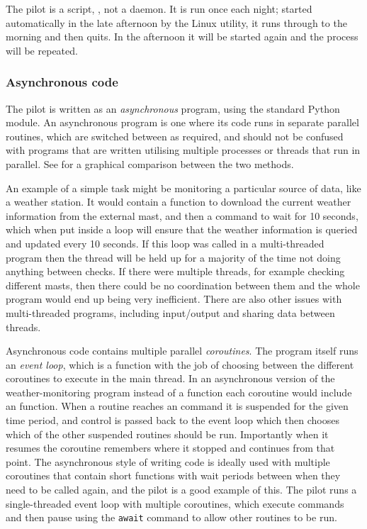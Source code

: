 \begin{colsection}
\begin{colsection}
The pilot is a  script, , not a daemon. It is run once each night; started automatically in the late afternoon by the Linux  utility, it runs through to the morning and then quits. In the afternoon it will be started again and the process will be repeated.

\subsubsection{Asynchronous code}

The pilot is written as an \textit{asynchronous} program, using the standard Python  module. An asynchronous program is one where its code runs in separate parallel routines, which are switched between as required, and should not be confused with programs that are written utilising multiple processes or threads that run in parallel. See  for a graphical comparison between the two methods.

An example of a simple task might be monitoring a particular source of data, like a weather station. It would contain a function to download the current weather information from the external mast, and then a  command to wait for 10 seconds, which when put inside a loop will ensure that the weather information is queried and updated every 10 seconds. If this loop was called in a multi-threaded program then the thread will be held up for a majority of the time not doing anything between checks. If there were multiple threads, for example checking different masts, then there could be no coordination between them and the whole program would end up being very inefficient. There are also other issues with multi-threaded programs, including input/output and sharing data between threads.

Asynchronous code contains multiple parallel \textit{coroutines}. The program itself runs an \textit{event loop}, which is a function with the job of choosing between the different coroutines to execute in the main thread. In an asynchronous version of the weather-monitoring program instead of a  function each coroutine would include an  function. When a routine reaches an  command it is suspended for the given time period, and control is passed back to the event loop which then chooses which of the other suspended routines should be run. Importantly when it resumes the coroutine remembers where it stopped and continues from that point. The asynchronous style of writing code is ideally used with multiple coroutines that contain short functions with wait periods between when they need to be called again, and the pilot is a good example of this. The pilot runs a single-threaded event loop with multiple coroutines, which execute commands and then pause using the \texttt{await} command to allow other routines to be run.


\end{colsection}
\end{colsection}
